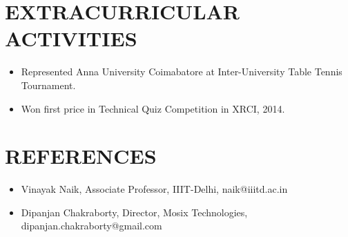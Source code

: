 \documentclass{res}
\begin{document}
\begin{resume}
 
  \section{EXTRACURRICULAR ACTIVITIES}
 \begin{itemize}
  \item Represented Anna University Coimabatore at Inter-University Table Tennis Tournament. 
  \item Won first price in Technical Quiz Competition in XRCI, 2014.
 \end{itemize}

  \section{REFERENCES}
 \begin{itemize}
  \item Vinayak Naik, Associate Professor, IIIT-Delhi, naik@iiitd.ac.in
  \item Dipanjan Chakraborty, Director, Mosix Technologies, dipanjan.chakraborty@gmail.com 
   \end{itemize} 

\end{resume}
\end{document}
